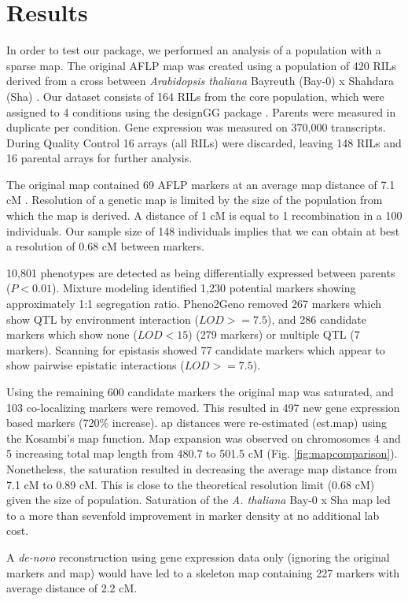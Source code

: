 \section{Results}
In order to test our package, we performed an analysis of a population with a sparse map.
The original AFLP map was created using a population of 420 RILs derived from a cross between 
\emph{Arabidopsis thaliana} Bayreuth (Bay-0) x Shahdara (Sha) \cite{Loudet:2002}. 
Our dataset consists of 164 RILs from the core population, which were assigned to 4 conditions 
using the designGG package \cite{Li:2009}. Parents were measured in duplicate per condition. 
Gene expression was measured on 370,000 transcripts. During Quality Control 16 arrays 
(all RILs) were discarded, leaving 148 RILs and 16 parental arrays for further analysis.

The original map contained 69 AFLP markers at an average map distance of 7.1 cM \cite{Loudet:2002}. 
Resolution of a genetic map is limited by the size of the population from which the map is derived. 
A distance of 1 cM is equal to 1 recombination in a 100 individuals. Our sample size of 148 
individuals implies that we can obtain at best a resolution of 0.68 cM between markers.

10,801 phenotypes are detected as being differentially expressed between parents 
($P < 0.01$). Mixture modeling identified 1,230 potential markers showing approximately 1:1 
segregation ratio. Pheno2Geno removed 267 markers which show QTL by environment interaction
($LOD >= 7.5$), and 286 candidate markers which show none ($LOD < 15$) (279 markers) or 
multiple QTL (7 markers). Scanning for epistasis showed 77 candidate markers which appear to 
show pairwise epistatic interactions ($LOD >= 7.5$). 

Using the remaining 600 candidate markers the original map was saturated, and 103 co-localizing 
markers were removed. This resulted in 497 new gene expression based markers (720\% increase). 
ap distances were re-estimated (est.map) using the Kosambi's map function. Map expansion was 
observed on chromosomes 4 and 5 increasing total map length from 480.7 to 501.5 
cM (Fig. \ref{fig:mapcomparison}). Nonetheless, the saturation resulted in decreasing the average map distance 
from 7.1 cM to 0.89 cM. This is close to the theoretical resolution limit (0.68 cM) given 
the size of population. Saturation of the \emph{A. thaliana} Bay-0 x Sha map led to a more 
than sevenfold improvement in marker density at no additional lab cost. 

A \emph{de-novo} reconstruction using gene expression data only (ignoring the original 
markers and map) would have led to a skeleton map containing 227 markers with average 
distance of 2.2 cM. 

